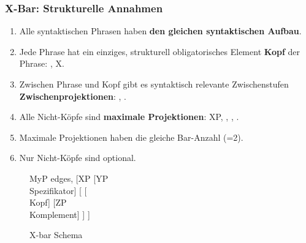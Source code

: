 \begin{frame}
\frametitle{X-Bar: Strukturelle Annahmen}

\begin{multicols}{2}
\begin{enumerate}
	\item Alle syntaktischen Phrasen haben \textbf{den gleichen syntaktischen Aufbau}.
	\item Jede Phrase hat ein einziges, strukturell obligatorisches Element \ras \textbf{Kopf} der Phrase: , X.
	\item Zwischen Phrase und Kopf gibt es syntaktisch relevante Zwischenstufen \ras \textbf{Zwischenprojektionen}: , .

\columnbreak

	\item Alle Nicht-Köpfe sind \textbf{maximale Projektionen}: XP, , ,  .
	\item Maximale Projektionen haben die gleiche Bar-Anzahl (=2).
	\item Nur Nicht-Köpfe sind optional.
\end{enumerate}
\end{multicols}

\citep[vgl.][]{Fries&MyP16a, MyP18b}

\end{frame}


\begin{frame}

\begin{figure}[b]
	\begin{minipage}[b]{0.05\textwidth}
	\end{minipage} 
	\begin{minipage}[b]{0.50\textwidth}
	\centering
		\begin{forest}
		MyP edges,
		[XP [YP\\Spezifikator]
			[ [\\Kopf]
				[ZP\\Komplement]
			]
		]
		\end{forest}
		\caption{X-bar Schema}	
  	\end{minipage}  
	\begin{minipage}[b]{0.05\textwidth}
  	\end{minipage}
  	
\end{figure}

\end{frame}


